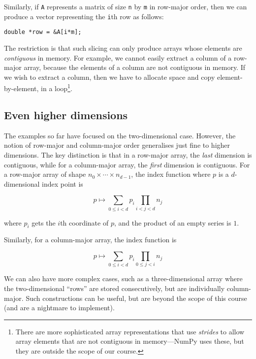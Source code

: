 Similarly, if \texttt{A} represents a matrix of size \texttt{n} by
\texttt{m} in row-major order, then we can produce a vector
representing the \texttt{i}th row as follows:
\begin{lstlisting}
double *row = &A[i*m];
\end{lstlisting}
The restriction is that such slicing can only produce arrays whose
elements are \emph{contiguous} in memory.  For example, we cannot
easily extract a column of a row-major array, because the elements of
a column are not contiguous in memory.  If we wish to extract a
column, then we have to allocate space and copy element-by-element, in
a loop\footnote{There are more sophisticated array representations
  that use \textit{strides} to allow array elements that are not
  contiguous in memory---NumPy uses these, but they are outside the
  scope of our course.}.

\subsection{Even higher dimensions}

The examples so far have focused on the two-dimensional case.
However, the notion of row-major and column-major order generalises
just fine to higher dimensions.  The key distinction is that in a row-major
array, the \textit{last} dimension is contiguous, while for a
column-major array, the \textit{first} dimension is contiguous.  For a
row-major array of shape $n_{0} \times{} \cdots \times{} n_{d-1}$, the
index function where $p$ is a $d$-dimensional index point is

\begin{equation}
  p \mapsto \sum_{0 \leq i < d} p_{i} \prod_{i<j<d} n_{j}
  \label{eqn:idxDrow}
\end{equation}

where $p_{i}$ gets the $i$th coordinate of $p$, and the product of an
empty series is $1$.

Similarly, for a column-major array, the index function is

\begin{equation}
  p \mapsto \sum_{0 \leq i < d} p_{i} \prod_{0\leq j<i} n_{j}
\end{equation}

We can also have more complex cases, such as a three-dimensional array
where the two-dimensional ``rows'' are stored consecutively, but are
individually column-major.  Such constructions can be useful, but are
beyond the scope of this course (and are a nightmare to implement).

